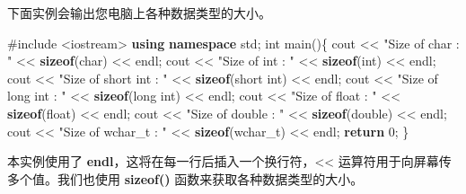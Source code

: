 \documentclass[
]{article}
\newenvironment{Shaded}{}{}
\newcommand{\ControlFlowTok}[1]{\textcolor[rgb]{0.00,0.44,0.13}{\textbf{#1}}}
\newcommand{\DataTypeTok}[1]{\textcolor[rgb]{0.56,0.13,0.00}{#1}}
\newcommand{\DecValTok}[1]{\textcolor[rgb]{0.25,0.63,0.44}{#1}}
\newcommand{\ImportTok}[1]{#1}
\newcommand{\KeywordTok}[1]{\textcolor[rgb]{0.00,0.44,0.13}{\textbf{#1}}}
\newcommand{\NormalTok}[1]{#1}
\newcommand{\OperatorTok}[1]{\textcolor[rgb]{0.40,0.40,0.40}{#1}}
\newcommand{\PreprocessorTok}[1]{\textcolor[rgb]{0.74,0.48,0.00}{#1}}
\newcommand{\StringTok}[1]{\textcolor[rgb]{0.25,0.44,0.63}{#1}}
\begin{document}
下面实例会输出您电脑上各种数据类型的大小。

\begin{Shaded}
\begin{Highlighting}[]
\PreprocessorTok{\#include }\ImportTok{\textless{}iostream\textgreater{}}
\KeywordTok{using} \KeywordTok{namespace}\NormalTok{ std}\OperatorTok{;}
\DataTypeTok{int}\NormalTok{ main}\OperatorTok{()\{}   
\NormalTok{    cout }\OperatorTok{\textless{}\textless{}} \StringTok{"Size of char : "} \OperatorTok{\textless{}\textless{}} \KeywordTok{sizeof}\OperatorTok{(}\DataTypeTok{char}\OperatorTok{)} \OperatorTok{\textless{}\textless{}}\NormalTok{ endl}\OperatorTok{;}   
\NormalTok{    cout }\OperatorTok{\textless{}\textless{}} \StringTok{"Size of int : "} \OperatorTok{\textless{}\textless{}} \KeywordTok{sizeof}\OperatorTok{(}\DataTypeTok{int}\OperatorTok{)} \OperatorTok{\textless{}\textless{}}\NormalTok{ endl}\OperatorTok{;}  
\NormalTok{    cout }\OperatorTok{\textless{}\textless{}} \StringTok{"Size of short int : "} \OperatorTok{\textless{}\textless{}} \KeywordTok{sizeof}\OperatorTok{(}\DataTypeTok{short} \DataTypeTok{int}\OperatorTok{)} \OperatorTok{\textless{}\textless{}}\NormalTok{ endl}\OperatorTok{;}  
\NormalTok{    cout }\OperatorTok{\textless{}\textless{}} \StringTok{"Size of long int : "} \OperatorTok{\textless{}\textless{}} \KeywordTok{sizeof}\OperatorTok{(}\DataTypeTok{long} \DataTypeTok{int}\OperatorTok{)} \OperatorTok{\textless{}\textless{}}\NormalTok{ endl}\OperatorTok{;}   
\NormalTok{    cout }\OperatorTok{\textless{}\textless{}} \StringTok{"Size of float : "} \OperatorTok{\textless{}\textless{}} \KeywordTok{sizeof}\OperatorTok{(}\DataTypeTok{float}\OperatorTok{)} \OperatorTok{\textless{}\textless{}}\NormalTok{ endl}\OperatorTok{;}   
\NormalTok{    cout }\OperatorTok{\textless{}\textless{}} \StringTok{"Size of double : "} \OperatorTok{\textless{}\textless{}} \KeywordTok{sizeof}\OperatorTok{(}\DataTypeTok{double}\OperatorTok{)} \OperatorTok{\textless{}\textless{}}\NormalTok{ endl}\OperatorTok{;}  
\NormalTok{    cout }\OperatorTok{\textless{}\textless{}} \StringTok{"Size of wchar\_t : "} \OperatorTok{\textless{}\textless{}} \KeywordTok{sizeof}\OperatorTok{(}\DataTypeTok{wchar\_t}\OperatorTok{)} \OperatorTok{\textless{}\textless{}}\NormalTok{ endl}\OperatorTok{;}   \ControlFlowTok{return} \DecValTok{0}\OperatorTok{;}
\OperatorTok{\}}
\end{Highlighting}
\end{Shaded}

本实例使用了
\textbf{endl}，这将在每一行后插入一个换行符，\textless\textless{}
运算符用于向屏幕传多个值。我们也使用 \textbf{sizeof()}
函数来获取各种数据类型的大小。
\end{document}
